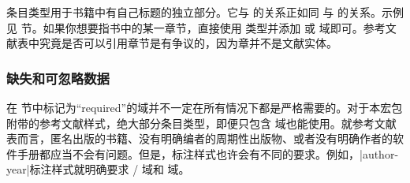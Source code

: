 
 条目类型用于书籍中有自己标题的独立部分。它与  的关系正如同  与  的关系。示例见  节。如果你想要指书中的某一章节，直接使用  类型并添加  或  域即可。参考文献表中究竟是否可以引用章节是有争议的，因为章并不是文献实体。

\subsubsection{缺失和可忽略数据}
\label{bib:use:key}


在  节中标记为“required”的域并不一定在所有情况下都是严格需要的。对于本宏包附带的参考文献样式，绝大部分条目类型，即便只包含  域也能使用。就参考文献表而言，匿名出版的书籍、没有明确编者的周期性出版物、或者没有明确作者的软件手册都应当不会有问题。但是，标注样式也许会有不同的要求。例如，|author-year|标注样式就明确要求 \slash {} 域和  域。

